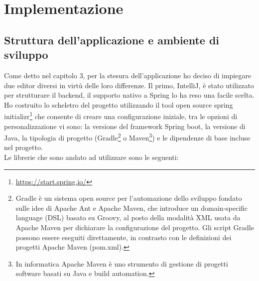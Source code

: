 \chapter{Implementazione}
\section{Struttura dell'applicazione e ambiente di sviluppo}
Come detto nel capitolo 3, per la stesura dell'applicazione ho deciso di impiegare due editor diversi in virtù delle loro differenze. Il primo, IntelliJ, è stato utilizzato per strutturare il backend, il supporto nativo a Spring lo ha reso una facile scelta.
\\
Ho costruito lo scheletro del progetto utilizzando il tool open source spring initializr\footnote{\url{https://start.spring.io/}} che consente di creare una configurazione iniziale, tra le opzioni di personalizzazione vi sono: la versione del framework Spring boot, la versione di Java, la tipologia di progetto (Gradle\footnote{
Gradle è un sistema open source per l'automazione dello sviluppo fondato sulle idee di Apache Ant e Apache Maven, che introduce un domain-specific language (DSL) basato su Groovy, al posto della modalità XML usata da Apache Maven per dichiarare la configurazione del progetto. Gli script Gradle possono essere eseguiti direttamente, in contrasto con le definizioni dei progetti Apache Maven (pom.xml).\cite{GradleDef}
} o Maven\footnote{
In informatica Apache Maven è uno strumento di gestione di progetti software basati su Java e build automation.\cite{MavenDef}
}) e le dipendenze di base incluse nel progetto.
\\
Le librerie che sono andato ad utilizzare sono le seguenti:
